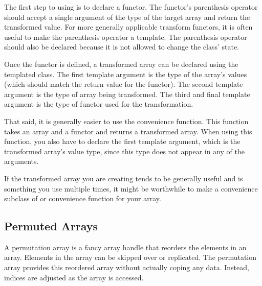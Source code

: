 The first step to using  is to declare
a functor. The functor's parenthesis operator should accept a single
argument of the type of the target array and return the transformed value.
For more generally applicable transform functors, it is often useful to
make the parenthesis operator a template. The parenthesis operator should
also be declared  because it is not allowed to change the
class' state.


Once the functor is defined, a transformed array can be declared using the
templated  class. The first template
argument is the type of the array's values (which should match the return
value for the functor). The second template argument is the type of array
being transformed. The third and final template argument is the type of
functor used for the transformation.

That said, it is generally easier to use the
 convenience function. This function
takes an array and a functor and returns a transformed array. When using
this function, you also have to declare the first template argument, which
is the transformed array's value type, since this type does not appear in
any of the arguments.


If the transformed array you are creating tends to be generally useful and
is something you use multiple times, it might be worthwhile to make a
convenience subclass of  or convenience
 function for your array.



\subsection{Permuted Arrays}
\label{sec:PermutedArrays}


A permutation array is a fancy array handle that reorders the elements in
an array. Elements in the array can be skipped over or replicated. The
permutation array provides this reordered array without actually coping any
data. Instead, indices are adjusted as the array is accessed.

